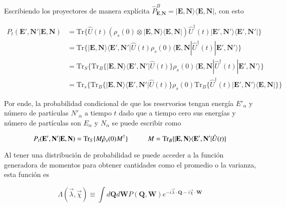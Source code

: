 Escribiendo los proyectores de manera explícita $\hat{P}^{B}_{\textbf{E}, \textbf{N} } = |\textbf{E}, \textbf{N} \rangle\langle \textbf{E}, \textbf{N}|$, con esto 

\begin{align*} 
    P_{t}(\textbf{E}',\textbf{N}'|\textbf{E},\textbf{N}) & =  \text{Tr}\{\hat{U}(t)(\rho_{s}(0)\otimes |\textbf{E}, \textbf{N}\rangle  \langle \textbf{E}, \textbf{N}| ) \hat{U}^{\dagger}(t)  |\textbf{E}', \textbf{N}'\rangle  \langle \textbf{E}', \textbf{N}'| \} \\
        & =  \text{Tr}\{|\textbf{E},\textbf{N} \rangle \langle \textbf{E}', \textbf{N}'| \hat{U}(t)\rho_{s}(0) \langle \textbf{E}, \textbf{N}|\hat{U}^{\dagger}(t)|\textbf{E}', \textbf{N}'\rangle \}      \\ 
        & = \text{Tr}_{S}\{ \text{Tr}_{B}\{|\textbf{E},\textbf{N} \rangle \langle \textbf{E}', \textbf{N}'|\hat{U}(t) \}\rho_{s}(0)\langle \textbf{E}, \textbf{N}|\hat{U}^{\dagger}(t)|\textbf{E}', \textbf{N}'\rangle      \} \\
        & = \text{Tr}_{s}\{ \text{Tr}_{B}\{|\textbf{E},\textbf{N}\rangle \langle \textbf{E}',\textbf{N}'|\hat{U}(t)  \} \rho_{s}(0) \text{Tr}_{B}\{\hat{U}^{\dagger}(t) |\textbf{E}',\textbf{N}' \rangle \langle \textbf{E},\textbf{N}| \}     \}
    \end{align*}    

Por ende, la probabilidad condicional de que los reservorios tengan energía $E'_{\alpha}$ y número de partículas $N'_{\alpha}$ a tiempo $t$ dado que a tiempo cero sus energías y número de partículas son $E_{\alpha}$ y $N_{\alpha}$ se puede escribir como

\begin{equation*}
    P_{t}(\textbf{E}',\textbf{N}'|\textbf{E},\textbf{N}) = \text{Tr}_{S}\{M \hat{\rho}_{s}(0)M^{\dagger} \}  \hspace{10mm} M = \text{Tr}_{B}\{|\textbf{E},\textbf{N} \rangle \langle \textbf{E}',\textbf{N}' | \hat{U}(t)\}
\end{equation*}

Al tener una distribución de probabilidad se puede acceder a la función generadora de momentos para obtener cantidades como el promedio o la varianza, esta función es

\begin{equation}
    \Lambda(\vec{\lambda},\vec{\chi}) \equiv \int d\textbf{Q} d\textbf{W}P(\textbf{Q},\textbf{W}) e^{-i\vec{\lambda}\cdot \textbf{Q} -i\vec{\chi}\cdot \textbf{W} }
\label{sec2funciongeneradora}
\end{equation}

